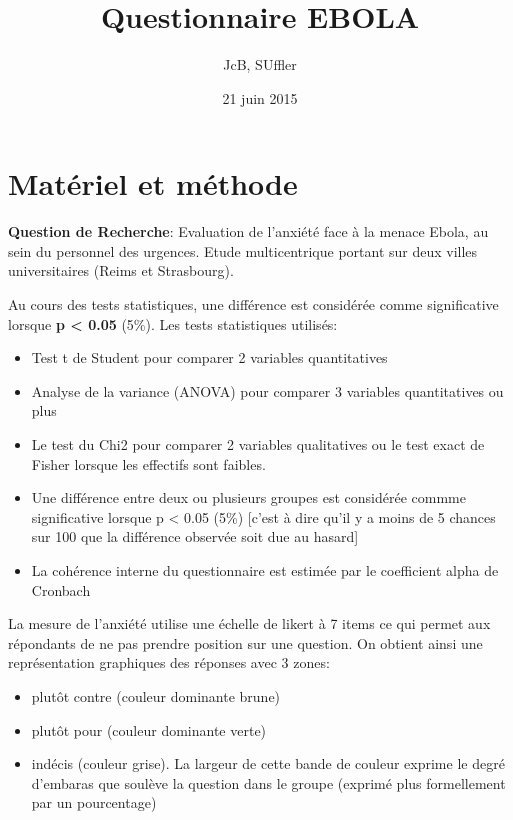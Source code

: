 \documentclass[]{article}
\title{Questionnaire EBOLA}
\author{JcB, SUffler}
\date{21 juin 2015}
\begin{document}
\maketitle


{
\hypersetup{linkcolor=black}
\setcounter{tocdepth}{2}
\tableofcontents
}
\section{Matériel et méthode}\label{materiel-et-methode}

\textbf{Question de Recherche}: Evaluation de l'anxiété face à la menace
Ebola, au sein du personnel des urgences. Etude multicentrique portant
sur deux villes universitaires (Reims et Strasbourg).

Au cours des tests statistiques, une différence est considérée comme
significative lorsque \textbf{p \textless{} 0.05} (5\%). Les tests
statistiques utilisés:

\begin{itemize}
\itemsep1pt\parskip0pt
\item
  Test t de Student pour comparer 2 variables quantitatives
\item
  Analyse de la variance (ANOVA) pour comparer 3 variables quantitatives
  ou plus
\item
  Le test du Chi2 pour comparer 2 variables qualitatives ou le test
  exact de Fisher lorsque les effectifs sont faibles.
\item
  Une différence entre deux ou plusieurs groupes est considérée commme
  significative lorsque p \textless{} 0.05 (5\%) {[}c'est à dire qu'il y
  a moins de 5 chances sur 100 que la différence observée soit due au
  hasard{]}
\item
  La cohérence interne du questionnaire est estimée par le coefficient
  alpha de Cronbach
\end{itemize}

La mesure de l'anxiété utilise une échelle de likert à 7 items ce qui
permet aux répondants de ne pas prendre position sur une question. On
obtient ainsi une représentation graphiques des réponses avec 3 zones:

\begin{itemize}
\itemsep1pt\parskip0pt
\item
  plutôt contre (couleur dominante brune)
\item
  plutôt pour (couleur dominante verte)
\item
  indécis (couleur grise). La largeur de cette bande de couleur exprime
  le degré d'embaras que soulève la question dans le groupe (exprimé
  plus formellement par un pourcentage)
\end{itemize}
\end{document}
